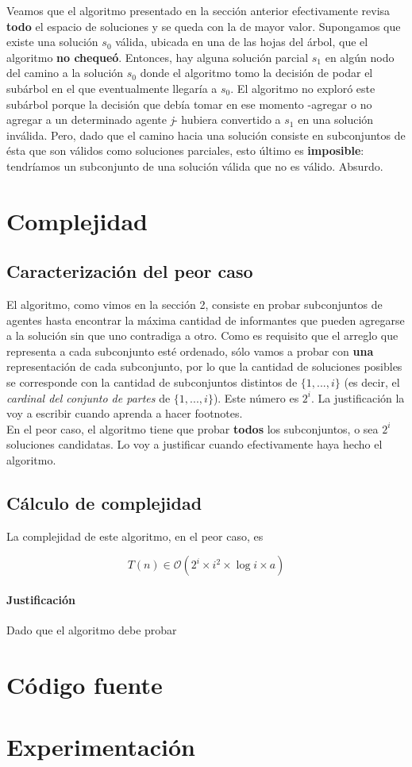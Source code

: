 \documentclass[10pt, a4paper]{article}
\begin{document}
	Veamos que el algoritmo presentado en la sección anterior efectivamente revisa \textbf{todo} el espacio de soluciones y se queda con la de mayor valor.
	Supongamos que existe una solución $s_{0}$ válida, ubicada en una de las hojas del árbol, que el algoritmo \textbf{no chequeó}. Entonces, hay alguna solución parcial $s_{1}$ en algún nodo del camino a la solución $s_{0}$ donde el algoritmo tomo la decisión de podar el subárbol en el que eventualmente llegaría a $s_{0}$. El algoritmo no exploró este subárbol porque la decisión que debía tomar en ese momento -agregar o no agregar a un determinado agente \textit{j}- hubiera convertido a $s_{1}$ en una solución inválida. Pero, dado que el camino hacia una solución consiste en subconjuntos de ésta que son válidos como soluciones parciales, esto último es \textbf{imposible}: tendríamos un subconjunto de una solución válida que no es válido. Absurdo.

\section{Complejidad}

	\subsection{Caracterizaci\'on del peor caso}
	El algoritmo, como vimos en la secci\'on 2, consiste en probar subconjuntos de agentes hasta encontrar la m\'axima cantidad de informantes que pueden agregarse a la soluci\'on sin que uno contradiga a otro. Como es requisito que el arreglo que representa a cada subconjunto est\'e ordenado, s\'olo vamos a probar con \textbf{una} representaci\'on de cada subconjunto, por lo que la cantidad de soluciones posibles se corresponde con la cantidad de subconjuntos distintos de $\{1,...,i\}$ (es decir, el \textit{cardinal del conjunto de partes} de $\{1,...,i\}$). Este n\'umero es $2^{i}$. La justificaci\'on la voy a escribir cuando aprenda a hacer footnotes.
	\\
	En el peor caso, el algoritmo tiene que probar \textbf{todos} los subconjuntos, o sea $2^{i}$ soluciones candidatas. Lo voy a justificar cuando efectivamente haya hecho el algoritmo.

	\subsection{C\'alculo de complejidad}
	La complejidad de este algoritmo, en el peor caso, es

	\begin{equation*}	
	T(n) \in \mathcal{O}(2^{i} \times i^{2} \times \log{i} \times a )
	\end{equation*}
	
	\paragraph{Justificaci\'on}
	Dado que el algoritmo debe probar 

\section{C\'odigo fuente}

\section{Experimentaci\'on}
\end{document}
